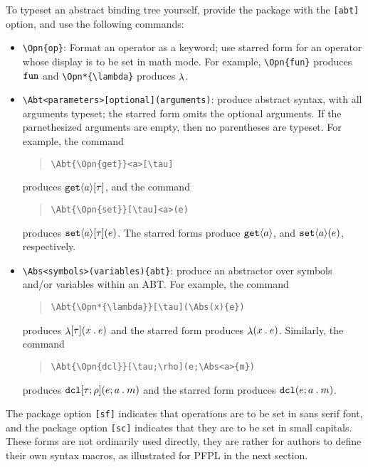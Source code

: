 \documentclass[11pt]{article}
\begin{document}
To typeset an abstract binding tree yourself, provide the package with the \verb|[abt]| option, and use the following commands:
\begin{itemize}
  \item \verb|\Opn{op}|: Format an operator as a keyword; use starred form for an operator whose display is to be set in math mode.  For example, \verb|\Opn{fun}| produces $\Opn{fun}$ and \verb|\Opn*{\lambda}| produces $\Opn*{\lambda}$.
  \item \verb|\Abt<parameters>[optional](arguments)|: produce abstract syntax, with all arguments typeset; the starred form omits the optional arguments.  If the parnethesized arguments are empty, then no parentheses are typeset.  For example, the command
  \begin{quote}
\begin{verbatim}
\Abt{\Opn{get}}<a>[\tau]
\end{verbatim}
  \end{quote}
  produces $\Abt{\Opn{get}}<a>[\tau]$, and the command
  \begin{quote}
\begin{verbatim}
\Abt{\Opn{set}}[\tau]<a>(e)
\end{verbatim}
  \end{quote}
  produces $\Abt{\Opn{set}}<a>[\tau](e)$.  The starred forms produce $\Abt*{\Opn{get}}<a>[\tau]$, and $\Abt*{\Opn{set}}<a>[\tau](e)$, respectively.

  \item \verb|\Abs<symbols>(variables){abt}|: produce an abstractor over symbols and/or variables within an ABT.  For example, the command
  \begin{quote}
\begin{verbatim}
\Abt{\Opn*{\lambda}}[\tau](\Abs(x){e})
\end{verbatim}
  \end{quote}
  produces $\Abt{\Opn*{\lambda}}[\tau](\Abs(x){e})$ and the starred form produces $\Abt*{\Opn*{\lambda}}[\tau](\Abs(x){e})$.  Similarly, the command
  \begin{quote}
\begin{verbatim}
\Abt{\Opn{dcl}}[\tau;\rho](e;\Abs<a>{m})
\end{verbatim}
  \end{quote}
  produces $\Abt{\Opn{dcl}}[\tau;\rho](e;\Abs<a>{m})$ and the starred form produces $\Abt*{\Opn{dcl}}[\tau\,\rho](e;\Abs<a>{m})$.
\end{itemize}

The package option \verb|[sf]| indicates that operations are to be set in sans serif font, and the package option \verb|[sc]| indicates that they are to be set in small capitals.
These forms are not ordinarily used directly, they are rather for authors to define their own syntax macros, as illustrated for \textsf{PFPL} in the next section.
\end{document}
